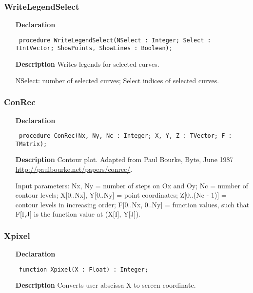 \documentclass[12pt,a4paper,oneside]{report}
\newcommand{\declarationitem}[1]{\textbf{#1}}
\newcommand{\descriptiontitle}[1]{\textbf{#1}}
\newcommand{\code}[1]{\texttt{#1}}
\begin{document}
\subsubsection{WriteLegendSelect}
\label{uplot-WriteLegendSelect}
\begin{itemize}\item[\declarationitem{Declaration}\hfill]
	\begin{flushleft}
		\code{
			procedure WriteLegendSelect(NSelect : Integer; Select : TIntVector; ShowPoints, ShowLines : Boolean);}
		
	\end{flushleft}
	
	\par
	\item[\descriptiontitle{Description}]
	Writes legends for selected curves.
	
	NSelect: number of selected curves; Select  indices of selected curves.
	
\end{itemize}
\subsubsection{ConRec}
\label{uplot-ConRec}
\begin{itemize}\item[\declarationitem{Declaration}\hfill]
	\begin{flushleft}
		\code{
			procedure ConRec(Nx, Ny, Nc : Integer; X, Y, Z : TVector; F : TMatrix);}
		
	\end{flushleft}
	
	\par
	\item[\descriptiontitle{Description}]
	Contour plot. Adapted from Paul Bourke, Byte, June 1987\\ \href{http://paulbourke.net/papers/conrec/}{http://paulbourke.net/papers/conrec/}.
	
	Input parameters: Nx, Ny = number of steps on Ox and Oy; Nc = number of contour levels; X[0..Nx], Y[0..Ny] = point coordinates; Z[0..(Nc {-} 1)] = contour levels in increasing order; F[0..Nx, 0..Ny] = function values, such that F[I,J] is the function value at (X[I], Y[J]).
	
\end{itemize}
\subsubsection{Xpixel}
\label{uplot-Xpixel}
\begin{itemize}\item[\declarationitem{Declaration}\hfill]
	\begin{flushleft}
		\code{
			function Xpixel(X : Float) : Integer;}
		
	\end{flushleft}
	
	\par
	\item[\descriptiontitle{Description}]
	Converts user abscissa X to screen coordinate.
	
\end{itemize}
\end{document}
